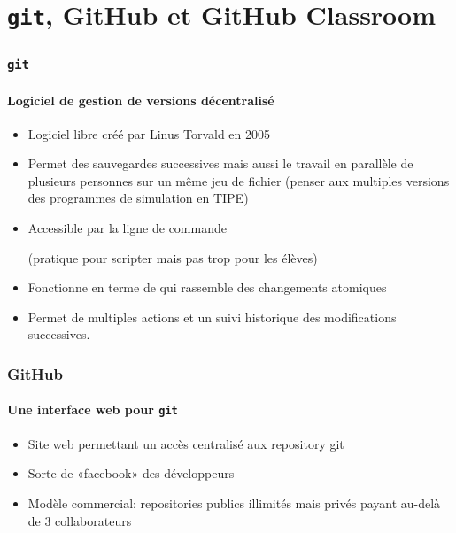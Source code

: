 \section{\texttt{git}, GitHub et GitHub Classroom}

\begin{frame}
\frametitle{\texttt{git}}
\framesubtitle{Logiciel de gestion de versions décentralisé}

\begin{itemize}[<+->]
	\item	 Logiciel libre créé par Linus Torvald en 2005
	\item  Permet des sauvegardes successives mais aussi le travail en parallèle de plusieurs personnes sur un même jeu de fichier (penser aux multiples versions des programmes de simulation en TIPE)
	\item  Accessible par la ligne de commande

	(pratique pour scripter mais pas trop pour les élèves)
	\item  Fonctionne en terme de  qui rassemble des changements atomiques
	\item 	Permet de multiples actions et un suivi historique des modifications successives.

\end{itemize}

\end{frame}


\begin{frame}
\frametitle{GitHub}
\framesubtitle{Une interface web pour \texttt{git}}

\begin{itemize}[<+->]
	\item Site web permettant un accès centralisé aux repository git

	\item Sorte de «facebook» des développeurs

	\item Modèle commercial: repositories publics illimités mais privés payant au-delà de 3 collaborateurs

\end{itemize}

\end{frame}


